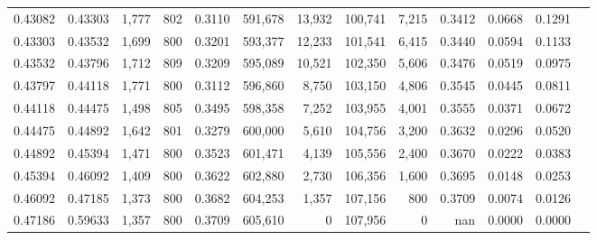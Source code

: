 \begin{tabular}{rrrrrrrrrrrrr}
0.43082 & 0.43303 &  1,777 & 802 &                                     0.3110 & 591,678 &  13,932 & 100,741 &   7,215 & 0.3412 & 0.0668 & 0.1291 \\
0.43303 & 0.43532 &  1,699 & 800 &                                     0.3201 & 593,377 &  12,233 & 101,541 &   6,415 & 0.3440 & 0.0594 & 0.1133 \\
0.43532 & 0.43796 &  1,712 & 809 &                                     0.3209 & 595,089 &  10,521 & 102,350 &   5,606 & 0.3476 & 0.0519 & 0.0975 \\
0.43797 & 0.44118 &  1,771 & 800 &                                     0.3112 & 596,860 &   8,750 & 103,150 &   4,806 & 0.3545 & 0.0445 & 0.0811 \\
0.44118 & 0.44475 &  1,498 & 805 &                                     0.3495 & 598,358 &   7,252 & 103,955 &   4,001 & 0.3555 & 0.0371 & 0.0672 \\
0.44475 & 0.44892 &  1,642 & 801 &                                     0.3279 & 600,000 &   5,610 & 104,756 &   3,200 & 0.3632 & 0.0296 & 0.0520 \\
0.44892 & 0.45394 &  1,471 & 800 &                                     0.3523 & 601,471 &   4,139 & 105,556 &   2,400 & 0.3670 & 0.0222 & 0.0383 \\
0.45394 & 0.46092 &  1,409 & 800 &                                     0.3622 & 602,880 &   2,730 & 106,356 &   1,600 & 0.3695 & 0.0148 & 0.0253 \\
0.46092 & 0.47185 &  1,373 & 800 &                                     0.3682 & 604,253 &   1,357 & 107,156 &     800 & 0.3709 & 0.0074 & 0.0126 \\
0.47186 & 0.59633 &  1,357 & 800 &                                     0.3709 & 605,610 &       0 & 107,956 &       0 &    nan & 0.0000 & 0.0000 \\
\bottomrule
\end{tabular}
